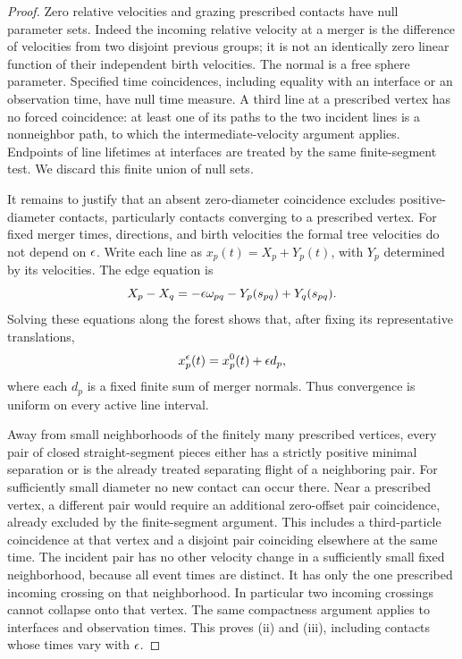 \begin{proof}
Zero relative velocities and grazing prescribed contacts have
null parameter sets.  Indeed the incoming relative velocity at a
merger is the difference of velocities from two disjoint previous
groups; it is not an identically zero linear function of their
independent birth velocities.  The normal is a free sphere
parameter.  Specified time coincidences, including equality with
an interface or an observation time, have null time measure.  A
third line at a prescribed vertex has no forced coincidence:
at least one of its paths to the two incident lines is a
nonneighbor path, to which the intermediate-velocity argument
applies.  Endpoints of line lifetimes at interfaces are treated
by the same finite-segment test.  We discard this finite union of
null sets.

It remains to justify that an absent zero-diameter coincidence
excludes positive-diameter contacts, particularly contacts converging
to a prescribed vertex.  For fixed merger times, directions, and
birth velocities the formal tree velocities do not depend on
\(\epsilon\).  Write each line as
\(x_p(t)=X_p+Y_p(t)\), with \(Y_p\) determined by its velocities.
The edge equation is
\[
 X_p-X_q=-\epsilon\omega_{pq}-Y_p(s_{pq})+Y_q(s_{pq}).
\]
Solving these equations along the forest shows that, after fixing
its representative translations,
\begin{equation}\label{eq:sharp-uniform-tree-convergence}
        x_p^\epsilon(t)=x_p^0(t)+\epsilon d_p,
\end{equation}
where each \(d_p\) is a fixed finite sum of merger normals.
Thus convergence is uniform on every active line interval.

Away from small neighborhoods of the finitely many prescribed
vertices, every pair of closed straight-segment pieces either
has a strictly positive minimal separation or is the already
treated separating flight of a neighboring pair.  For sufficiently
small diameter no new contact can occur there.  Near a prescribed
vertex, a different pair would require an additional zero-offset
pair coincidence, already excluded by the finite-segment argument.
This includes a third-particle coincidence at that vertex and a
disjoint pair coinciding elsewhere at the same time.  The incident
pair has no other velocity
change in a sufficiently small fixed neighborhood, because all
event times are distinct.  It has only the one prescribed incoming
crossing on that neighborhood.  In particular two incoming
crossings cannot collapse onto that vertex.  The same compactness
argument applies to interfaces and observation times.  This proves
(ii) and (iii), including contacts whose times vary with \(\epsilon\).
\end{proof}

